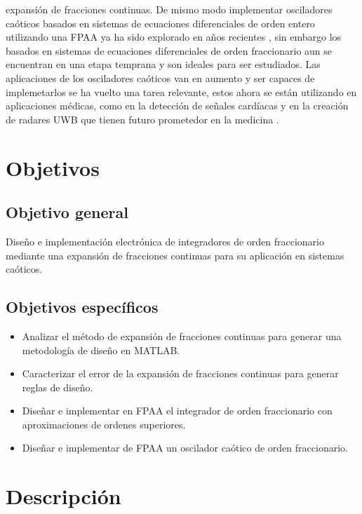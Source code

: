 expansión de fracciones continuas. De mismo modo implementar osciladores caóticos basados en sistemas de ecuaciones diferenciales de orden entero utilizando una FPAA ya ha sido explorado en años recientes \cite{Caponetto2006,Li2018}, sin embargo los basados en sistemas de ecuaciones diferenciales de orden fraccionario aun se encuentran en una etapa temprana y son ideales para ser estudiados. Las aplicaciones de los osciladores caóticos van en aumento y ser capaces de implemetarlos se ha vuelto una tarea relevante, estos ahora se están utilizando en aplicaciones médicas, como en la detección de señales cardíacas \cite{Jiang2010} y en la creación de radares UWB que tienen futuro prometedor en la medicina \cite{Kumari2017}.
	
	\section{Objetivos}
	
		\subsection{Objetivo general}
			Diseño e implementación electrónica de integradores de orden fraccionario mediante una expansión de fracciones continuas para su aplicación en sistemas caóticos.		
		
		\subsection{Objetivos específicos}
			\begin{itemize}
			\item Analizar el método de expansión de fracciones continuas para generar una metodología de diseño en MATLAB.
			\item Caracterizar el error de la expansión de fracciones continuas para generar reglas de diseño.
			\item Diseñar e implementar en FPAA el integrador de orden fraccionario con aproximaciones de ordenes superiores.
			\item Diseñar e implementar de FPAA un oscilador caótico de orden fraccionario. 
		\end{itemize}
		
		
	\section{Descripción}

